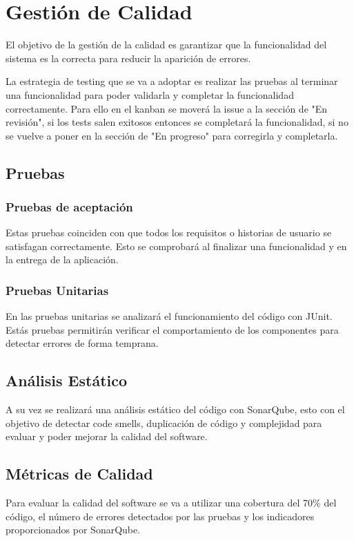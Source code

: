\section{Gestión de Calidad}

El objetivo de la gestión de la calidad es garantizar que la funcionalidad del sistema es la correcta para reducir la aparición de errores.

La estrategia de testing que se va a adoptar es realizar las pruebas al terminar una funcionalidad para poder validarla y completar la funcionalidad correctamente. Para ello en el kanban se moverá la issue a la sección de "En revisión", si los tests salen exitosos entonces se completará la funcionalidad,  si no se vuelve a poner en la sección de "En progreso" para corregirla y completarla.

\subsection{Pruebas}

\subsubsection{Pruebas de aceptación}

Estas pruebas coinciden con que todos los requisitos o historias de usuario se satisfagan correctamente. Esto se comprobará al finalizar una funcionalidad y en la entrega de la aplicación.

\subsubsection{Pruebas Unitarias}

En las pruebas unitarias se analizará el funcionamiento del código con JUnit. Estás pruebas permitirán verificar el comportamiento de los componentes para detectar errores de forma temprana.

\subsection{Análisis Estático}

A su vez se realizará una análisis estático del código con SonarQube, esto con el objetivo de detectar code smells, duplicación de código y complejidad para evaluar y poder mejorar la calidad del software.

\subsection{Métricas de Calidad}

Para evaluar la calidad del software se va a utilizar una cobertura del 70\% del código, el número de errores detectados por las pruebas y los indicadores proporcionados por SonarQube.